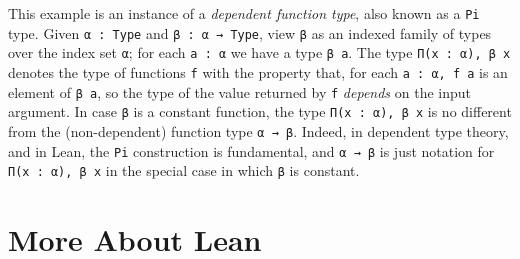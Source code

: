 \documentclass[11pt]{amsart}  %
\begin{document}
This example is an instance of a \emph{dependent function type}, also known as a \lstinline{Pi} type. Given \lstinline{α : Type} and \lstinline{β : α → Type},
view \lstinline{β} as an indexed family of types over the index set \lstinline{α}; for each \lstinline{a : α} we have a type \lstinline{β a}.  The type \lstinline{Π(x : α), β x} denotes the type of functions \lstinline{f} with the property that, for each \lstinline{a : α, f a} is an element of \lstinline{β a}, so the type of the value returned by \lstinline{f} \emph{depends} on the input argument. In case \lstinline{β} is a constant function, the type \lstinline{Π(x : α), β x} is no different from the (non-dependent) function type \lstinline{α → β}. Indeed, in dependent type theory, and in Lean, the \lstinline{Pi} construction is fundamental, and \lstinline{α → β} is just notation for \lstinline{Π(x : α), β x} in the special case in which \lstinline{β} is constant.


\section{More About Lean}
\end{document}
